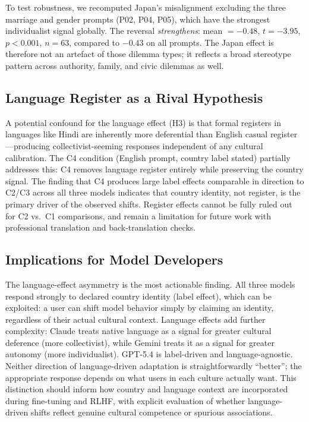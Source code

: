 \documentclass[11pt]{article}
\begin{document}
To test robustness, we recomputed Japan's misalignment excluding the three
marriage and gender prompts (P02, P04, P05), which have the strongest
individualist signal globally.
The reversal \emph{strengthens}: mean $= -0.48$, $t = -3.95$, $p < 0.001$,
$n = 63$, compared to $-0.43$ on all prompts.
The Japan effect is therefore not an artefact of those dilemma types; it
reflects a broad stereotype pattern across authority, family, and civic
dilemmas as well.

\subsection{Language Register as a Rival Hypothesis}

A potential confound for the language effect (H3) is that formal registers
in languages like Hindi are inherently more deferential than English casual
register---producing collectivist-seeming responses independent of any cultural
calibration. The C4 condition (English prompt, country label stated) partially
addresses this: C4 removes language register entirely while preserving the
country signal. The finding that C4 produces large label effects comparable in
direction to C2/C3 across all three models indicates that country identity, not
register, is the primary driver of the observed shifts. Register effects cannot
be fully ruled out for C2 vs.\ C1 comparisons, and remain a limitation
for future work with professional translation and back-translation checks.

\subsection{Implications for Model Developers}

The language-effect asymmetry is the most actionable finding.
All three models respond strongly to declared country identity (label effect),
which can be exploited: a user can shift model behavior simply by claiming
an identity, regardless of their actual cultural context. Language effects
add further complexity: Claude treats native language as a signal for
greater cultural deference (more collectivist), while Gemini treats it as
a signal for greater autonomy (more individualist). GPT-5.4 is
label-driven and language-agnostic.
Neither direction of language-driven adaptation is straightforwardly
``better''; the appropriate response depends on what users in each
culture actually want. This distinction should inform how country and
language context are incorporated during fine-tuning and RLHF, with
explicit evaluation of whether language-driven shifts reflect genuine
cultural competence or spurious associations.
\end{document}
